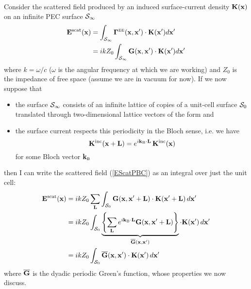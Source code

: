 Consider the scattered field produced by an 
induced surface-current density $\mathbf{K}(\mathbf{x})$ on
an infinite PEC surface $\mathcal{S}_\infty$
\begin{align}
  \mathbf{E}^{\hbox{\scriptsize{scat}}}(\mathbf{x})
&=
  \int_{\mathcal{S}_\infty} 
   \boldsymbol{\Gamma}^{\hbox{\tiny{EE}}}(\mathbf{x}, \mathbf{x}^\prime)
   \cdot 
   \mathbf{K}(\mathbf{x}^\prime)d\mathbf{x}^\prime
\\
&=
  ikZ_0
  \int_{\mathcal{S}_\infty} 
   \mathbf{G}(\mathbf{x}, \mathbf{x}^\prime) 
   \cdot 
   \mathbf{K}(\mathbf{x}^\prime)d\mathbf{x}^\prime
\label{EScatPBC}
\end{align}
where $k=\omega/c$ ($\omega$ is the angular frequency
at which we are working) and $Z_0$ is the impedance
of free space (assume we are in vacuum for now).
If we now suppose that 
\begin{itemize}
 \item the surface $\mathcal{S}_\infty$ consists of an infinite lattice
       of copies of a unit-cell surface $\mathcal{S}_0$ translated through
       two-dimensional lattice vectors of the form 
       and
 \item the surface current respects this periodicity in the 
       Bloch sense, i.e. we have
       $$ \mathbf{K}^{\hbox{\scriptsize{inc}}}(\mathbf{x}+\mathbf{L})
          = e^{i\mathbf{k}_{\hbox{\tiny{B}}} \cdot \mathbf{L}} \, \mathbf{K}^{\hbox{\scriptsize{inc}}}(\mathbf{x})
       $$
       for some Bloch vector $\mathbf{k}_{\hbox{\tiny{B}}}$
\end{itemize}
then I can write the scattered field (\ref{EScatPBC}) as an integral
over just the unit cell:
\begin{align}
   \mathbf{E}^{\hbox{\scriptsize{scat}}}(\mathbf{x})
&= ikZ_0 
   \sum_{\mathbf{L}}
   \int_{\mathcal{S}_0}
   \mathbf{G}(\mathbf{x}, \mathbf{x}^\prime+\mathbf{L})
   \cdot 
   \mathbf{K}(\mathbf{x}^\prime + \mathbf{L} ) \, d\mathbf{x}^\prime
\nonumber \\
&= ikZ_0
   \int_{\mathcal{S}_0}
   \underbrace{
   \left\{
   \sum_{\mathbf{L}}
   e^{i\mathbf{k}_{\hbox{\tiny{B}}} \cdot \mathbf{L}}
   \mathbf{G}(\mathbf{x}, \mathbf{x}^\prime+\mathbf{L})
   \right\}
              }_{\overline{\mathbf{G}}(\mathbf{x}, \mathbf{x}^\prime)}
   \cdot 
   \mathbf{K}(\mathbf{x}^\prime) \, d\mathbf{x}^\prime
\nonumber \\
&= ikZ_0 
   \int_{\mathcal{S}_0}
   \overline{\mathbf{G}}(\mathbf{x}, \mathbf{x}^\prime)
   \cdot 
   \mathbf{K}(\mathbf{x}^\prime) \, d\mathbf{x}^\prime
\label{EScatPBC}
\end{align}
where $\overline{\mathbf{G}}$ is the dyadic periodic Green's function,
whose properties we now discuss.

